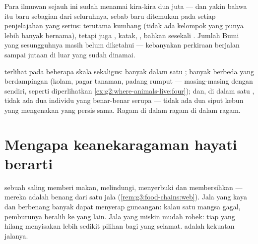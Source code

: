 \begin{example}\label{ex:g5:biodiversity:planet}
Para ilmuwan sejauh ini sudah menamai kira-kira dua juta  ---
dan yakin bahwa itu baru sebagian dari seluruhnya, sebab  baru
ditemukan pada setiap penjelajahan yang serius: terutama kumbang
(tidak ada kelompok yang punya lebih banyak  bernama), tetapi
juga , katak, , bahkan sesekali . Jumlah 
Bumi yang sesungguhnya masih belum diketahui --- kebanyakan perkiraan
berjalan sampai jutaan di luar yang sudah dinamai.
\end{example}

\begin{remark}\label{rem:g5:biodiversity:scales}
 terlihat pada beberapa skala sekaligus: banyak
 dalam satu ; banyak  berbeda yang berdampingan
(kolam, pagar tanaman, padang rumput --- masing-masing dengan
 sendiri, seperti diperlihatkan
\cref{ex:g2:where-animals-live:four}); dan, di dalam satu ,
tidak ada dua individu yang benar-benar serupa --- tidak ada dua siput
kebun yang mengenakan  yang persis sama. Ragam di dalam ragam
di dalam ragam.
\end{remark}

\section{Mengapa keanekaragaman hayati berarti}

\begin{proposition}\label{prop:g5:biodiversity:web}
 sebuah  saling memberi makan, melindungi, menyerbuki
dan membersihkan --- mereka adalah benang dari satu jala
(\cref{rem:g3:food-chains:web}). Jala yang kaya dan berbenang banyak
dapat menyerap guncangan: kalau satu  mangsa gagal, pemburunya
beralih ke  yang lain. Jala yang miskin mudah robek: tiap
 yang hilang menyisakan lebih sedikit pilihan bagi yang
selamat.  adalah kekuatan jalanya.
\end{proposition}
\admitted

